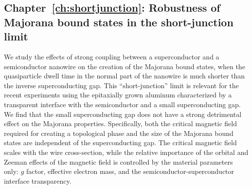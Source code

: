 \subsection{Chapter~\ref{ch:shortjunction}: Robustness of Majorana bound states in the short-junction limit}
We study the effects of strong coupling between a superconductor and a semiconductor nanowire on the creation of the Majorana bound states, when the quasiparticle dwell time in the normal part of the nanowire is much shorter than the inverse superconducting gap.
This ``short-junction'' limit is relevant for the recent experiments using the epitaxially grown aluminum characterized by a transparent interface with the semiconductor and a small superconducting gap.
We find that the small superconducting gap does not have a strong detrimental effect on the Majorana properties.
Specifically, both the critical magnetic field required for creating a topological phase and the size of the Majorana bound states are independent of the superconducting gap.
The critical magnetic field scales with the wire cross-section, while the relative importance of the orbital and Zeeman effects of the magnetic field is controlled by the material parameters only: $g$ factor, effective electron mass, and the semiconductor-superconductor interface transparency.



